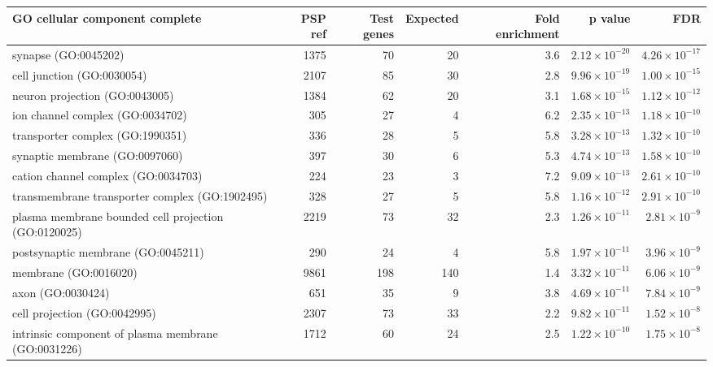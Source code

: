 \begin{table}[ht]
\centering
\begin{adjustbox}{width=\textwidth}

\begin{tabular}{lrrrrrr}
  \hline
GO cellular component complete & PSP ref & Test genes & Expected & Fold enrichment & p value & FDR \\ 
  \hline
synapse (GO:0045202) & 1375 & 70 & 20 & 3.6 & $2.12 \times 10^{-20}$ & $4.26 \times 10^{-17}$ \\ 
  cell junction (GO:0030054) & 2107 & 85 & 30 & 2.8 & $9.96 \times 10^{-19}$ & $1.00 \times 10^{-15}$ \\ 
  neuron projection (GO:0043005) & 1384 & 62 & 20 & 3.1 & $1.68 \times 10^{-15}$ & $1.12 \times 10^{-12}$ \\ 
  ion channel complex (GO:0034702) & 305 & 27 & 4 & 6.2 & $2.35 \times 10^{-13}$ & $1.18 \times 10^{-10}$ \\ 
  transporter complex (GO:1990351) & 336 & 28 & 5 & 5.8 & $3.28 \times 10^{-13}$ & $1.32 \times 10^{-10}$ \\ 
  synaptic membrane (GO:0097060) & 397 & 30 & 6 & 5.3 & $4.74 \times 10^{-13}$ & $1.58 \times 10^{-10}$ \\ 
  cation channel complex (GO:0034703) & 224 & 23 & 3 & 7.2 & $9.09 \times 10^{-13}$ & $2.61 \times 10^{-10}$ \\ 
  transmembrane transporter complex (GO:1902495) & 328 & 27 & 5 & 5.8 & $1.16 \times 10^{-12}$ & $2.91 \times 10^{-10}$ \\ 
  plasma membrane bounded cell projection (GO:0120025) & 2219 & 73 & 32 & 2.3 & $1.26 \times 10^{-11}$ & $2.81 \times 10^{-9}$ \\ 
  postsynaptic membrane (GO:0045211) & 290 & 24 & 4 & 5.8 & $1.97 \times 10^{-11}$ & $3.96 \times 10^{-9}$ \\ 
  membrane (GO:0016020) & 9861 & 198 & 140 & 1.4 & $3.32 \times 10^{-11}$ & $6.06 \times 10^{-9}$ \\ 
  axon (GO:0030424) & 651 & 35 & 9 & 3.8 & $4.69 \times 10^{-11}$ & $7.84 \times 10^{-9}$ \\ 
  cell projection (GO:0042995) & 2307 & 73 & 33 & 2.2 & $9.82 \times 10^{-11}$ & $1.52 \times 10^{-8}$ \\ 
  intrinsic component of plasma membrane (GO:0031226) & 1712 & 60 & 24 & 2.5 & $1.22 \times 10^{-10}$ & $1.75 \times 10^{-8}$ \\ 

\end{tabular}
\end{adjustbox}
\end{table}

